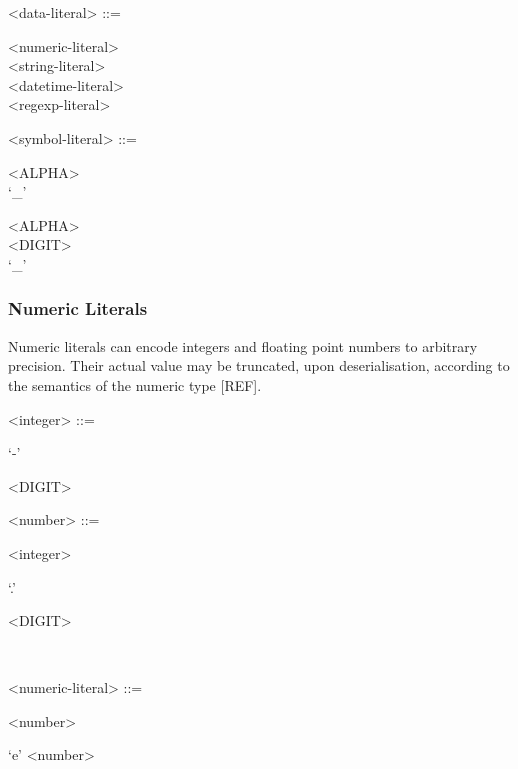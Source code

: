 \begin{grammar}
  <data-literal> ::= \begin{syntdiag}
    \begin{stack}
      <numeric-literal> \\
      <string-literal> \\
      <datetime-literal> \\
      <regexp-literal>
    \end{stack}
  \end{syntdiag}

  <symbol-literal> ::= \begin{syntdiag}
    \begin{stack}
      <ALPHA> \\
      `_'
    \end{stack}
    \begin{rep}
      \begin{stack}
        <ALPHA> \\
        <DIGIT> \\
        `_'
      \end{stack}
    \end{rep}
  \end{syntdiag}
\end{grammar}

\subsubsection{Numeric Literals}

Numeric literals can encode integers and floating point numbers to
arbitrary precision. Their actual value may be truncated, upon
deserialisation, according to the semantics of the numeric type [REF].

\begin{grammar}
  <integer> ::= \begin{syntdiag}
    \begin{stack}
      `-' \\
    \end{stack}
    \begin{rep}
      <DIGIT>
    \end{rep}
  \end{syntdiag}

  <number> ::= \begin{syntdiag}
    <integer>
    \begin{stack}
      `.' \begin{rep}<DIGIT>\end{rep} \\
    \end{stack}
  \end{syntdiag}

  <numeric-literal> ::= \begin{syntdiag}
    <number>
    \begin{stack}
      `e' <number> \\
    \end{stack}
  \end{syntdiag}
\end{grammar}

